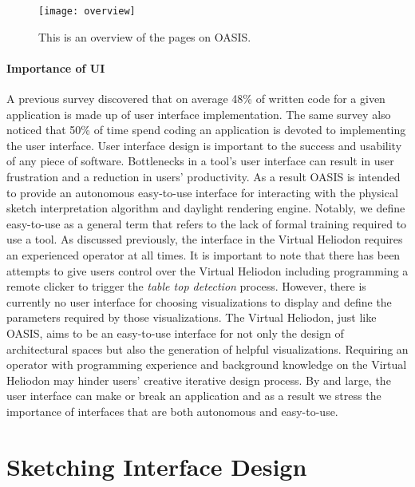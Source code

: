 \begin{figure}[h]
\centering
\texttt{[image: overview]}
\caption{This is an overview of the pages on OASIS.}
\label{fig:overview}
\end{figure}

\paragraph{Importance of UI}
A previous survey discovered that on average 48\% of written code for a given application is made up of user interface implementation\cite{Myers1992}.
The same survey also noticed that 50\% of time spend coding an application is devoted to implementing the user interface\cite{Myers1992}.
User interface design is important to the success and usability of any piece of software.
Bottlenecks in a tool's user interface can result in user frustration and a reduction in users' productivity.
As a result OASIS is intended to provide an autonomous easy-to-use interface for interacting with the physical sketch interpretation algorithm and daylight rendering engine.
Notably, we define easy-to-use  as a general term that refers to the lack of formal training required to use a tool.
As discussed previously, the interface in the Virtual Heliodon requires an experienced operator at all times.
It is important to note that there has been attempts to give users control over the Virtual Heliodon including programming a remote clicker to trigger the \textit{table top detection} process.
However, there is currently no user interface for choosing visualizations to display and define the parameters required by those visualizations.
The Virtual Heliodon, just like OASIS, aims to be an easy-to-use interface for not only the design of architectural spaces but also the generation of helpful visualizations.
Requiring an operator with programming experience and background knowledge on the Virtual Heliodon may hinder users' creative iterative design process.
By and large, the user interface can make or break an application and as a result we stress the importance of interfaces that are both autonomous and easy-to-use.

\section{Sketching Interface Design}

